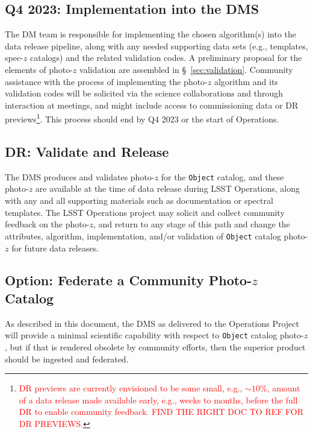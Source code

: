 \documentclass[DM,lsstdraft,toc]{lsstdoc}
\begin{document}
\subsection{Q4 2023: Implementation into the DMS}\label{ssec:time_impl}

The DM team is responsible for implementing the chosen algorithm(s) into the data release pipeline, along with any needed supporting data sets (e.g., templates, spec-$z$ catalogs) and the related validation codes.
A preliminary proposal for the elements of photo-$z$ validation are assembled in \S~\ref{sec:validation}.
Community assistance with the process of implementing the photo-$z$ algorithm and its validation codes will be solicited via the science collaborations and through interaction at meetings, and might include access to commissioning data or DR previews\footnote{\textcolor{red}{DR previews are currently envisioned to be some small, e.g., $\sim10\%$, amount of a data release made available early, e.g., weeks to months, before the full DR to enable community feedback. FIND THE RIGHT DOC TO REF FOR DR PREVIEWS.}}.
This process should end by Q4 2023 or the start of Operations.

\subsection{DR: Validate and Release}\label{ssec:time_valdr}

The DMS produces and validates photo-$z$ for the {\tt Object} catalog, and these photo-$z$ are available at the time of data release during LSST Operations, along with any and all supporting materials such as documentation or spectral templates.
The LSST Operations project may solicit and collect community feedback on the photo-$z$, and return to any stage of this path and change the attributes, algorithm, implementation, and/or validation of {\tt Object} catalog photo-$z$ for future data releases.

\subsection{Option: Federate a Community Photo-$z$ Catalog}\label{ssec:time_opt}

As described in this document, the DMS as delivered to the Operations Project will provide a minimal scientific capability with respect to {\tt Object} catalog photo-$z$, but if that is rendered obsolete by community efforts, then the superior product should be ingested and federated.
\end{document}
